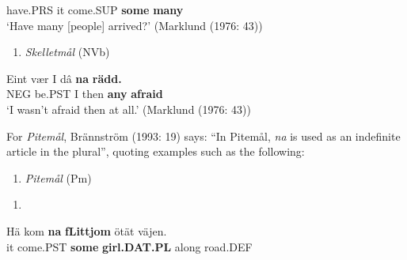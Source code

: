 have.PRS  it  come.SUP  \textbf{some} \textbf{many}\\ %


‘Have many [people] arrived?’ (Marklund (1976: 43))
\z

\begin{enumerate} %
\item 
\textit{Skelletmål} (NVb)
\end{enumerate} %
\ea\label{}
\gll Eint  vær  I  dâ  \textbf{na} \textbf{rädd.}\\


NEG  be.PST  I  then  \textbf{any} \textbf{afraid}\\ %


‘I wasn’t afraid then at all.’ (Marklund (1976: 43))
\z

For \textit{Pitemål}, Brännström (1993: 19) says: “In Pitemål, \textit{na} is used as an indefinite article in the plural”, quoting examples such as the following:

\begin{enumerate} %
\item 
\textit{Pitemål }(Pm)
\end{enumerate} %
\setcounter{listLFOxcviiileveli}{0}
\begin{enumerate} %
\item 
\end{enumerate} %
\ea\label{}
\gll Hä  kom  \textbf{na}\textbf{  fLi{\textasciigrave}ttjom} ötät  väjen.\\


it  come.PST  \textbf{some} \textbf{girl.DAT.PL} along  road.DEF\\ %


